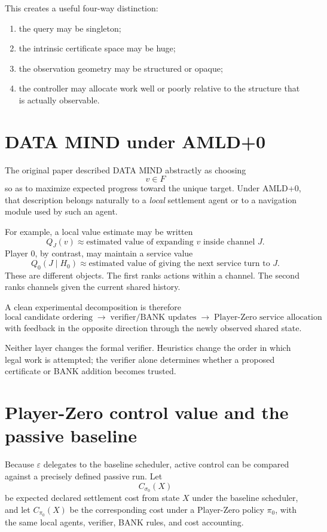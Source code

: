 \documentclass[11pt]{article}
\begin{document}
This creates a useful four-way distinction:
\begin{enumerate}
    \item the query may be singleton;
    \item the intrinsic certificate space may be huge;
    \item the observation geometry may be structured or opaque;
    \item the controller may allocate work well or poorly relative to the
    structure that is actually observable.
\end{enumerate}

\section{DATA MIND under AMLD+0}

The original paper described DATA MIND abstractly as choosing
\[
 v\in F
\]
so as to maximize expected progress toward the unique target.  Under AMLD+0,
that description belongs naturally to a \emph{local} settlement agent or to a
navigation module used by such an agent.

For example, a local value estimate may be written
\[
Q_J(v)\approx
\text{estimated value of expanding }v\text{ inside channel }J.
\]
Player 0, by contrast, may maintain a service value
\[
Q_0(J\mid H_0)\approx
\text{estimated value of giving the next service turn to }J.
\]
These are different objects.  The first ranks actions within a channel.  The
second ranks channels given the current shared history.

A clean experimental decomposition is therefore
\[
\boxed{
\text{local candidate ordering}
\;\longrightarrow\;
\text{verifier/BANK updates}
\;\longrightarrow\;
\text{Player-Zero service allocation}
}
\]
with feedback in the opposite direction through the newly observed shared
state.

Neither layer changes the formal verifier.  Heuristics change the order in
which legal work is attempted; the verifier alone determines whether a
proposed certificate or BANK addition becomes trusted.

\section{Player-Zero control value and the passive baseline}

Because $\varepsilon$ delegates to the baseline scheduler, active control can
be compared against a precisely defined passive run.  Let
\[
C_{\sigma_0}(X)
\]
be expected declared settlement cost from state $X$ under the baseline
scheduler, and let $C_{\pi_0}(X)$ be the corresponding cost under a Player-Zero
policy $\pi_0$, with the same local agents, verifier, BANK rules, and cost
accounting.
\end{document}

